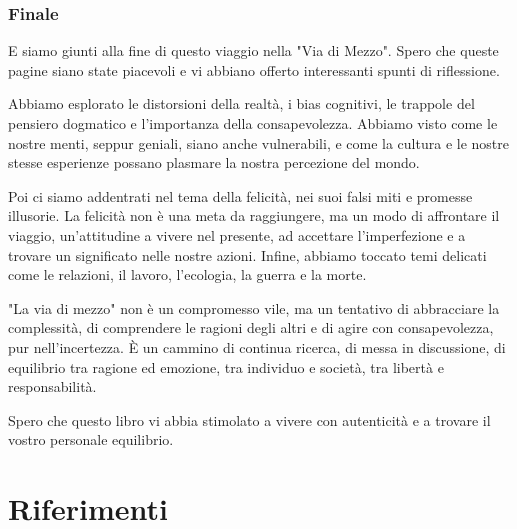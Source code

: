 \documentclass[12pt]{book} %
\begin{document}
\subsubsection{Finale}

E siamo giunti alla fine di questo viaggio nella "Via di Mezzo". Spero che queste pagine siano state piacevoli e vi abbiano offerto interessanti spunti di riflessione.

Abbiamo esplorato le distorsioni della realtà, i bias cognitivi, le trappole del pensiero dogmatico e l'importanza della consapevolezza. Abbiamo visto come le nostre menti, seppur geniali, siano anche vulnerabili, e come la cultura e le nostre stesse esperienze possano plasmare la nostra percezione del mondo.

Poi ci siamo addentrati nel tema della felicità, nei suoi falsi miti e promesse illusorie. La felicità non è una meta da raggiungere, ma un modo di affrontare il viaggio, un'attitudine a vivere nel presente, ad accettare l'imperfezione e a trovare un significato nelle nostre azioni.
Infine, abbiamo toccato temi delicati come le relazioni, il lavoro, l'ecologia, la guerra e la morte.

"La via di mezzo" non è un compromesso vile, ma un tentativo di abbracciare la complessità, di comprendere le ragioni degli altri e di agire con consapevolezza, pur nell'incertezza. È un cammino di continua ricerca, di messa in discussione, di equilibrio tra ragione ed emozione, tra individuo e società, tra libertà e responsabilità.

Spero che questo libro vi abbia stimolato a vivere con autenticità e a trovare il vostro personale equilibrio.

\clearpage\section{Riferimenti}
\theendnotes

\clearpage
\end{document}
